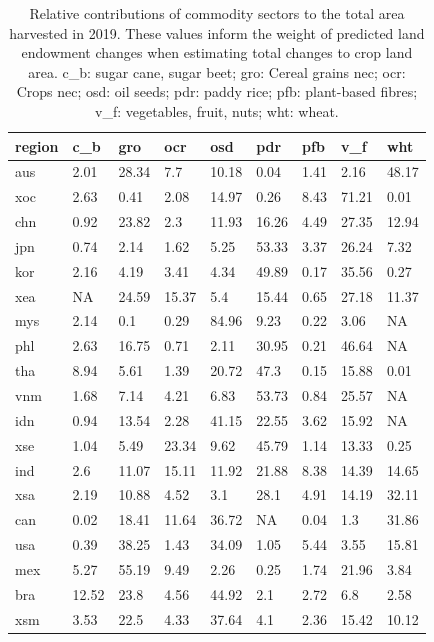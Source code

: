 \documentclass[titlesmallcaps,copyrightpage]{uomthesis}\usepackage[]{graphicx}\usepackage[]{color}
\begin{document}
\begin{table}[htb]
\centering
\caption{Relative contributions of commodity sectors to the total area harvested in 2019. These values inform the weight of predicted land endowment changes when estimating total changes to crop land area. c\_b: sugar cane, sugar beet; gro: Cereal grains nec; ocr: Crops nec; osd: oil seeds; pdr: paddy rice; pfb: plant-based fibres; v\_f: vegetables, fruit, nuts; wht: wheat.}
\label{apx:ch4:tab_faoharvested}
\begin{tabularx}{0.7\textwidth}{lllllllll}
\toprule
region & c\_b & gro & ocr & osd & pdr & pfb & v\_f & wht \\
\bottomrule
aus & 2.01 & 28.34 & 7.7 & 10.18 & 0.04 & 1.41 & 2.16 & 48.17 \\
xoc & 2.63 & 0.41 & 2.08 & 14.97 & 0.26 & 8.43 & 71.21 & 0.01 \\
chn & 0.92 & 23.82 & 2.3 & 11.93 & 16.26 & 4.49 & 27.35 & 12.94 \\
jpn & 0.74 & 2.14 & 1.62 & 5.25 & 53.33 & 3.37 & 26.24 & 7.32 \\
kor & 2.16 & 4.19 & 3.41 & 4.34 & 49.89 & 0.17 & 35.56 & 0.27 \\
xea & NA & 24.59 & 15.37 & 5.4 & 15.44 & 0.65 & 27.18 & 11.37 \\
mys & 2.14 & 0.1 & 0.29 & 84.96 & 9.23 & 0.22 & 3.06 & NA \\
phl & 2.63 & 16.75 & 0.71 & 2.11 & 30.95 & 0.21 & 46.64 & NA \\
tha & 8.94 & 5.61 & 1.39 & 20.72 & 47.3 & 0.15 & 15.88 & 0.01 \\
vnm & 1.68 & 7.14 & 4.21 & 6.83 & 53.73 & 0.84 & 25.57 & NA \\
idn & 0.94 & 13.54 & 2.28 & 41.15 & 22.55 & 3.62 & 15.92 & NA \\
xse & 1.04 & 5.49 & 23.34 & 9.62 & 45.79 & 1.14 & 13.33 & 0.25 \\
ind & 2.6 & 11.07 & 15.11 & 11.92 & 21.88 & 8.38 & 14.39 & 14.65 \\
xsa & 2.19 & 10.88 & 4.52 & 3.1 & 28.1 & 4.91 & 14.19 & 32.11 \\
can & 0.02 & 18.41 & 11.64 & 36.72 & NA & 0.04 & 1.3 & 31.86 \\
usa & 0.39 & 38.25 & 1.43 & 34.09 & 1.05 & 5.44 & 3.55 & 15.81 \\
mex & 5.27 & 55.19 & 9.49 & 2.26 & 0.25 & 1.74 & 21.96 & 3.84 \\
bra & 12.52 & 23.8 & 4.56 & 44.92 & 2.1 & 2.72 & 6.8 & 2.58 \\
xsm & 3.53 & 22.5 & 4.33 & 37.64 & 4.1 & 2.36 & 15.42 & 10.12 \\

\end{tabularx}
\end{table}
\end{document}
